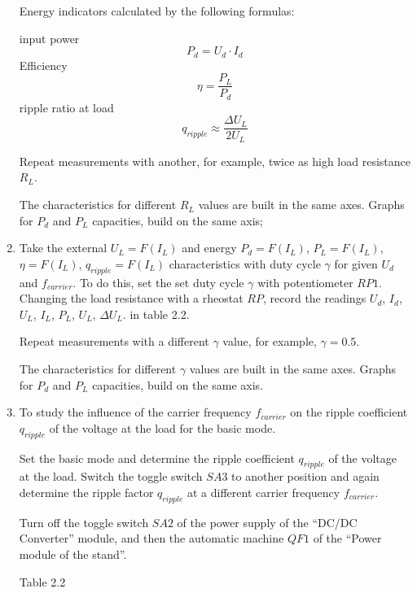 \documentclass[a4paper,14pt]{article}
\begin{document}
\begin{enumerate}
Energy indicators calculated by the following formulas:

input power
\begin{equation}
	P_d = U_d\cdot I_d
\end{equation}
Efficiency
\begin{equation}
	\eta = \frac{P_L}{P_d}
\end{equation}
ripple ratio at load
\begin{equation}
q_{ripple} \approx \frac{\Delta U_L}{2U_L} 
\end{equation}

Repeat measurements with another, for example, twice as high load resistance $R_L$.

The characteristics for different $R_L$ values are built in the same axes.
Graphs for $P_d$ and $P_L$ capacities, build on the same axis;

\item Take the external $U_L=F(I_L)$ and energy $P_d = F(I_L)$, $P_L = F(I_L)$, $\eta = F(I_L)$, $q_{ripple} = F(I_L)$ 
characteristics with duty cycle $\gamma$ for given $U_d$ and $f_{carrier}$.
To do this, set the set duty cycle $\gamma$ with potentiometer $RP1$.
Changing the load resistance with a rheostat $RP$, record the readings $U_d$, $I_d$, $U_L$, $I_L$, $P_L$, $U_L$,
$\Delta U_L$.  in table 2.2.

Repeat measurements with a different $\gamma$ value, for example, $\gamma = 0.5$.

The characteristics for different $\gamma$ values are built in the same axes.
Graphs for $P_d$ and $P_L$ capacities, build on the same axis.

\item To study the influence of the carrier frequency $f_{carrier}$ on the ripple coefficient 
$q_{ripple}$ of the voltage at the load for the basic mode.

Set the basic mode and determine the ripple coefficient $q_{ripple}$ of the voltage at the load.
Switch the toggle switch $SA3$ to another position and again determine the ripple factor $q_{ripple}$ 
at a different carrier frequency $f_{carrier}$.

Turn off the toggle switch $SA2$ of the power supply of the ``DC/DC Converter'' module, and then the automatic machine 
$QF1$ of the “Power module of the stand”.

Table 2.2



\end{enumerate}
\end{document}
